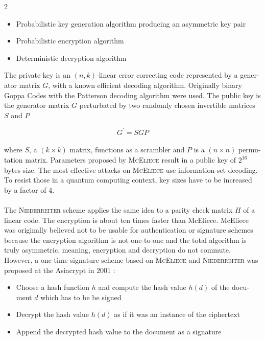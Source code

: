 \documentclass[a4paper,11pt]{article}
\begin{document}
\begin{otherlanguage}{english}
\begin{multicols}{2}
\begin{itemize} [noitemsep, nolistsep]
\item[1)] Probabilistic key generation algorithm producing an asymmetric key pair
\item[2)] Probabilistic encryption algorithm
\item[3)] Deterministic decryption algorithm
\end{itemize} 

\vspace{0.4cm}

The private key is an $(n,k)$-linear error correcting code represented by a generator matrix $G$, with a known efficient decoding algorithm. Originally binary Goppa Codes with the Patterson decoding algorithm were used. The public key is the generator matrix $G$ perturbated by two randomly chosen invertible matrices $S$ and $P$

$$ G^\prime = SGP $$
\\
where $S$, a $(k \times k)$ matrix, functions as a scrambler and $P$ is a $(n \times n)$ permutation matrix. Parameters proposed by \textsc{McEliece} \cite{MCE} result in a public key of $2^{16}$ bytes size. The most effective attacks on \textsc{McEliece} use information-set decoding. To resist those in a quantum computing context, key sizes have to be increased by a factor of 4.\\
\\
The \textsc{Niederreiter} scheme \cite{NR} applies the same idea to a parity check matrix $H$ of a linear code. The encryption is about ten times faster than McEliece. McEliece was originally believed not to be usable for authentication or signature schemes because the encryption algorithm is not one-to-one and the total algorithm is truly asymmetric, meaning, encryption and decryption do not commute. However, a one-time signature scheme based on \textsc{McEliece} and \textsc{Niederreiter} was 
proposed at the Asiacrypt in $2001$ \cite{CFS}: \\

\begin{itemize} [noitemsep, nolistsep]
\item[1)] Choose a hash function $h$  and compute the hash value $h(d)$ of the document $d$ which has to be be signed
\item[2)] Decrypt the hash value $h(d)$ as if it was an instance of the ciphertext
\item[3)] Append the decrypted hash value to the document as a signature
\end{itemize} 


\end{multicols}
\end{otherlanguage}
\end{document}
